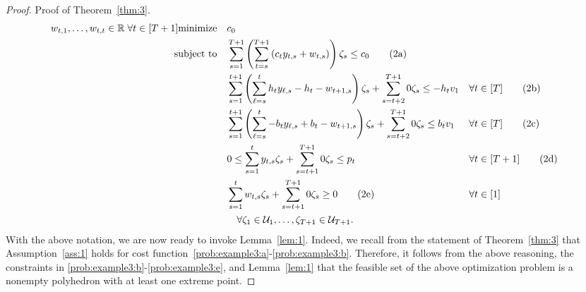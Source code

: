 \documentclass[nonblindrev,mnsc]{informs3} %
\def\Real{\mathbb{R}}
\let\R\Real
\begin{document}
\begin{APPENDICES}
\begin{proof}{Proof of Theorem~\ref{thm:3}.}
\begin{align}
{{w_{t,1},\ldots,w_{t,t} \in \R \; \forall t \in [T+1]}}{\textnormal{minimize}}\quad &c_0 \notag \\
\textnormal{subject to}\quad &   \sum_{s=1}^{T+1} \left(\sum_{t=s}^{T+1} \left( c_t y_{t,s} +   w_{t,s} \right) \right) \zeta_s  \le c_0 \tag{2a} \label{line:ldr_3a} \\
&  \sum_{s=1}^{t+1} \left(\sum_{\ell=s}^t h_t y_{\ell,s} - h_t - w_{t+1,s} \right) \zeta_s + \sum_{s=t+2}^{T+1} 0 \zeta_s \le -h_t v_1  &&  \forall  t \in [T] \tag{2b} \label{prob:example3:b}\\
& \sum_{s=1}^{t+1} \left(\sum_{\ell=s}^t -b_t y_{\ell,s} + b_t - w_{t+1,s} \right) \zeta_s + \sum_{s=t+2}^{T+1} 0 \zeta_s  \le b_t v_1  &&  \forall t \in [T] \tag{2c} \label{prob:example3:c}\\
 &0 \le  \sum_{s=1}^t y_{t,s} \zeta_s + \sum_{s=t+1}^{T+1} 0 \zeta_s \le p_t && \forall  t \in [T+1] \tag{2d} \label{prob:example3:d}\\
  &\sum_{s=1}^t w_{t,s} \zeta_s  + \sum_{s=t+1}^{T+1} 0 \zeta_s \ge 0 \tag{2e} && \forall t \in [1] \label{prob:example3:e}\\
& \quad \forall \zeta_1 \in \mathcal{U}_1,\ldots,\zeta_{T+1} \in \mathcal{U}_{T+1}.\notag \end{align}
With the above notation, we are now ready to invoke Lemma~\ref{lem:1}. Indeed, we recall from the statement of Theorem~\ref{thm:3} that Assumption~\ref{ass:1} holds for cost function~\eqref{prob:example3:a}-\eqref{prob:example3:b}. Therefore,  it follows from the above reasoning, the constraints in \eqref{prob:example3:b}-\eqref{prob:example3:e}, and Lemma~\ref{lem:1} that the feasible set of the above optimization problem is a nonempty polyhedron with at least one extreme point.  


\end{proof}
\end{APPENDICES}
\end{document}
